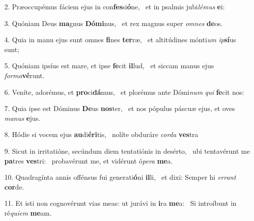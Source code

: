 2. Præoccupémus fáciem ejus in con\textbf{fes}si\textbf{ó}ne, \ast\  et in psalmis jubi\textit{lé}\textit{mus} \textbf{e}i:\

3. Quóniam Deus \textbf{ma}gnus \textbf{Dó}\textbf{mi}nus, \ast\  et rex magnus super \textit{om}\textit{nes} \textbf{de}os.\

4. Quia in manu ejus sunt omnes \textbf{fi}nes \textbf{ter}ræ, \ast\  et altitúdines mónti\textit{um} \textit{ip}\textbf{sí}us sunt;\

5. Quóniam ipsíus est mare, et ipse \textbf{fe}cit \textbf{il}lud, \ast\  et siccam manus ejus \textit{for}\textit{ma}\textbf{vé}runt.\

6. Veníte, adorémus, et \textbf{pro}ci\textbf{dá}mus, \ast\  et plorémus ante Dómi\textit{num} \textit{qui} \textbf{fe}cit nos:\

7. Quia ipse est Dóminus \textbf{De}us \textbf{nos}ter, \ast\  et nos pópulus páscuæ ejus, et oves \textit{ma}\textit{nus} \textbf{e}jus.\

8. Hódie si vocem ejus \textbf{au}di\textbf{é}\textbf{ri}tis, \ast\  nolíte obduráre \textit{cor}\textit{da} \textbf{ves}tra\

9. Sicut in irritatióne, secúndum diem tentatiónis in desérto, \dag\  ubi tentavérunt me \textbf{pa}tres \textbf{ves}tri: \ast\  probavérunt me, et vidérunt ó\textit{pe}\textit{ra} \textbf{me}a.\

10. Quadragínta annis offénsus fui generati\textbf{ó}ni \textbf{il}li, \ast\  et dixi: Semper hi \textit{er}\textit{rant} \textbf{cor}de.\

11. Et isti non cognovérunt vias meas: ut jurávi in \textbf{i}ra \textbf{me}a: \ast\  Si introíbunt in ré\textit{qui}\textit{em} \textbf{me}am.\

